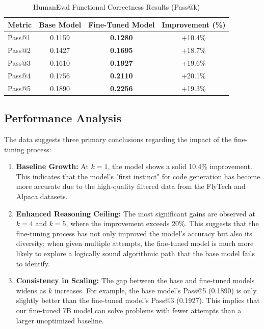 \begin{table}[H]
\centering
\caption{HumanEval Functional Correctness Results (Pass@k)}
\label{tab:humaneval_results}
\begin{tabular}{@{}lccc@{}}
\toprule
\textbf{Metric} & \textbf{Base Model} & \textbf{Fine-Tuned Model} & \textbf{Improvement (\%)} \\ \midrule
Pass@1 & 0.1159 & \textbf{0.1280} & +10.4\% \\
Pass@2 & 0.1427 & \textbf{0.1695} & +18.7\% \\
Pass@3 & 0.1610 & \textbf{0.1927} & +19.6\% \\
Pass@4 & 0.1756 & \textbf{0.2110} & +20.1\% \\
Pass@5 & 0.1890 & \textbf{0.2256} & +19.3\% \\ \bottomrule
\end{tabular}
\end{table}



\subsection{Performance Analysis}
The data suggests three primary conclusions regarding the impact of the fine-tuning process:

\begin{enumerate}
    \item \textbf{Baseline Growth:} At $k=1$, the model shows a solid 10.4\% improvement. This indicates that the model's "first instinct" for code generation has become more accurate due to the high-quality filtered data from the FlyTech and Alpaca datasets.
    
    \item \textbf{Enhanced Reasoning Ceiling:} The most significant gains are observed at $k=4$ and $k=5$, where the improvement exceeds 20\%. This suggests that the fine-tuning process has not only improved the model's accuracy but also its diversity; when given multiple attempts, the fine-tuned model is much more likely to explore a logically sound algorithmic path that the base model fails to identify.
    
    \item \textbf{Consistency in Scaling:} The gap between the base and fine-tuned models widens as $k$ increases. For example, the base model’s Pass@5 (0.1890) is only slightly better than the fine-tuned model’s Pass@3 (0.1927). This implies that our fine-tuned 7B model can solve problems with fewer attempts than a larger unoptimized baseline.
\end{enumerate}

